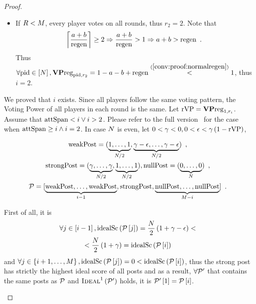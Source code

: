 \documentclass[a4paper,english,cleveref, autoref]{oasics-v2019}
\begin{document}
\begin{subappendices}
\begin{proof}
\begin{itemize}
\begin{itemize}
      \item If $R < M$, every player votes on all rounds, thus $r_2
      = 2$. Note that
      \begin{equation}
        \label{conv:proof:normalregen}
        \ceil*{\frac{a + b}{\regen}} \geq 2 \Rightarrow \frac{a + b}{\regen} >
        1 \Rightarrow a + b > \regen\enspace.
      \end{equation}
      Thus $\forall \mathrm{pid} \in \left[N\right], \mathrm{\textbf{VP}reg}_{\mathrm{pid}, r_2}
      = 1 - a - b + \mathrm{regen} \overset{(\ref{conv:proof:normalregen})}{<} 1$, thus
      $i = 2$.
    \end{itemize}
    We proved that $i$ exists. Since all players follow the same voting pattern,
    the Voting Power of all players in each round is the same. Let $\mathrm{rVP} =
    \mathrm{\textbf{VP}reg}_{1, r_i}$. Assume that $\mathrm{attSpan} < i \vee i > 2$. Please
    refer to the full version~\cite{kiayias2018apuff} for the case when
    $\mathrm{attSpan} \geq i \wedge i = 2$. In case $N$ is even, let $0 <
    \gamma < 0, 0 < \epsilon < \gamma\left(1 - \mathrm{rVP}\right)$,

    \begin{gather*}
      \mathrm{weakPost} = (\underbrace{1, \dots, 1}_{N/2},
      \underbrace{\gamma - \epsilon, \dots, \gamma -
      \epsilon}_{N/2}) \enspace, \\
      \mathrm{strongPost} = (\underbrace{\gamma, \dots, \gamma}_{N/2},
      \underbrace{1, \dots, 1}_{N/2}), \mathrm{nullPost} =
      (\underbrace{0, \dots, 0}_{N}) \enspace, \\
      \mathcal{P} = [\underbrace{\mathrm{weakPost}, \dots, \mathrm{weakPost}}_{i - 1},
      \mathrm{strongPost}, \underbrace{\mathrm{nullPost}, \dots, \mathrm{nullPost}}_{M -
      i}] \enspace.
    \end{gather*}

    First of all, it is
    \begin{gather*}
      \forall j \in \left[i - 1\right], \mathrm{idealSc}\left(\mathcal{P}\left[j\right]\right) =
      \frac{N}{2}\left(1 + \gamma - \epsilon\right) < \\
      < \frac{N}{2}\left(1 + \gamma\right) =
      \mathrm{idealSc}\left(\mathcal{P}\left[i\right]\right)
    \end{gather*}
    and $\forall j \in \left\{i + 1, \dots,
    M\right\}, \mathrm{idealSc}\left(\mathcal{P}\left[j\right]\right) = 0 <
    \mathrm{idealSc}\left(\mathcal{P}\left[i\right]\right)$, thus the strong post has strictly the
    highest ideal score of all posts and as a result, $\forall \mathcal{P}'$ that
    contains the same posts as $\mathcal{P}$ and
    $\textsc{Ideal}^1\left(\mathcal{P}'\right)$ holds, it is
    $\mathcal{P}'\left[1\right] = \mathcal{P}\left[i\right]$.


\end{itemize}
\end{proof}
\end{subappendices}
\end{document}
